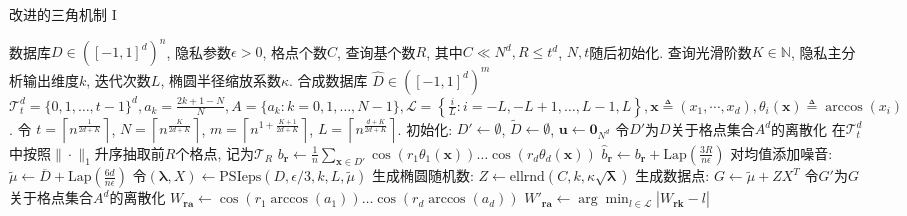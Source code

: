 \begin{algorithm}[hbtp]
\caption{改进的三角机制 I}\label{alg:改进的三角机制I}
\begin{algorithmic}[1]
  \REQUIRE 数据库$D \in \left([-1,1]^d \right)^n$, 隐私参数$\epsilon > 0$, 格点个数$C$, 查询基个数$R$, 其中$C\ll N^d, R \le t^d$, $N, t$随后初始化. 查询光滑阶数$K\in\mathbb{N}$, 隐私主分析输出维度$k$, 迭代次数$L$, 椭圆半径缩放系数$\kappa$.
  \ENSURE 合成数据库 $\hat{D} \in \left([-1,1]^d \right)^m$
  \NOTATION $\mathcal{T}_{t}^d = \{0,1,\ldots,t-1\}^d, a_k = \frac{2k+1-N}{N}, A = \{a_k\colon k=0,1,\ldots, N-1\}, \mathcal{L} = \left\{\frac{i}{L}\colon i=-L, -L+1, \ldots, L-1, L\right\}, \mathbf{x} \triangleq (x_1, \cdots, x_d), \theta_i(\mathbf{x}) \triangleq \arccos(x_i)$. 
  \STATE 令 $t= \left\lceil n^{\frac{1}{2d+K}} \right\rceil$,
   $N=\left\lceil n^\frac{K}{2d+K}\right\rceil$, $m=\left\lceil n^{1+\frac{K+1}{2d+K}}\right\rceil$,
   $L=\left\lceil n^{\frac{d+K}{2d+K}}\right\rceil$. \label{alg:line:改进三角机制I:参数设定}
  \STATE 初始化: $D' \leftarrow \emptyset$, $\tilde{D} \leftarrow \emptyset$, $\mathbf{u} \leftarrow \mathbf{0}_{N^d}$ \label{alg:line:改进三角机制I:初始化}
  \STATE 令$D'$为$D$关于格点集合$A^d$的离散化
  \STATE 在$\mathcal{T}_t^d$中按照$\|\cdot\|_1$升序抽取前$R$个格点, 记为$\mathcal{T}_R$
    \STATE $b_{\mathbf{r}} \leftarrow \frac{1}{n} \sum_{\mathbf{x}\in D'}\cos\left(r_1 \theta_1(\mathbf{x}) \right)\ldots \cos \left(r_d \theta_d(\mathbf{x}) \right)$ \label{alg:line:改进三角机制I:计算原始数据查询基结果}
    \STATE $\hat{b}_{\mathbf{r}} \leftarrow b_{\mathbf{r}} + \mathrm{Lap}\left(\frac{3R}{n \epsilon}\right)$ \label{alg:line:改进三角机制I:对查询基结果增加噪音}
     \label{alg:line:改进三角机制I:LP编码离散化b}
  \ENDFOR
  \STATE 对均值添加噪音: $\tilde{\mu} \leftarrow \overline{D} + \mathrm{Lap}\left(\frac{6d}{n\epsilon}\right)$ \label{alg:line:改进三角机制I:对均值添加噪音}
  \STATE 令$(\boldsymbol{\lambda}, X) \leftarrow \mathrm{PSIeps}\left(D, \epsilon/3, k, L, \tilde{\mu}\right)$ \label{alg:line:改进三角机制I:PSI主成分}
  \STATE 生成椭圆随机数: $Z \leftarrow \mathrm{ellrnd}\left(C, k, \kappa\sqrt{\boldsymbol{\lambda}}\right)$
  \STATE 生成数据点: $G \leftarrow \tilde{\mu} + ZX^T$ \label{alg:line:改进三角机制I:生成椭圆数据点}
  \STATE 令$G'$为$G$关于格点集合$A^d$的离散化
   \label{alg:line:改进三角机制I:计算格点查询基结果:begin}
      \STATE $W_{\mathbf{ra}} \leftarrow \cos \left(r_1 \arccos(a_1) \right)\ldots \cos \left(r_d \arccos(a_d) \right)$ \label{alg:line:改进三角机制I:计算格点查询基结果}
      \STATE $W'_{\mathbf{ra}} \leftarrow\arg\min_{l\in \mathcal{L}}|W_{\mathbf{rk}}-l|$ \label{alg:line:改进三角机制I:LP编码离散化W}
    \ENDFOR
  \ENDFOR \label{alg:line:改进三角机制I:计算格点查询基结果:end}
  

\end{algorithmic}
\end{algorithm}
